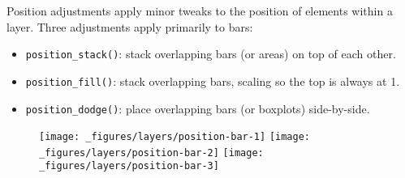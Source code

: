 

Position adjustments apply minor tweaks to the position of elements
within a layer. Three adjustments apply primarily to bars:

 
  

\begin{itemize}
\tightlist
\item
  \texttt{position\_stack()}: stack overlapping bars (or areas) on top
  of each other.
\item
  \texttt{position\_fill()}: stack overlapping bars, scaling so the top
  is always at 1.
\item
  \texttt{position\_dodge()}: place overlapping bars (or boxplots)
  side-by-side.
\end{itemize}

\begin{Shaded}
\begin{Highlighting}[]
\StringTok{ } \StringTok{ }
\StringTok{  }\NormalTok{(}\NormalTok{) +}\StringTok{ }\NormalTok{(}\NormalTok{) +}\StringTok{ }\NormalTok{(} \NormalTok{)}
\StringTok{ }\NormalTok{()}
\StringTok{ }\NormalTok{(} \NormalTok{)}
\StringTok{ }\NormalTok{(} \NormalTok{)}
\end{Highlighting}
\end{Shaded}

\begin{figure}[H]
  \texttt{[image: \_figures/layers/position-bar-1]}%
  \texttt{[image: \_figures/layers/position-bar-2]}%
  \texttt{[image: \_figures/layers/position-bar-3]}
\end{figure}

